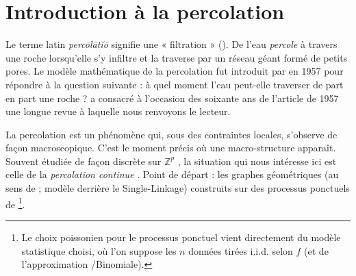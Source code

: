 

\section{Introduction à la percolation}

Le terme latin \emph{percōlātĭō} signifie une « filtration » (). De l'eau \emph{percole} à travers une roche lorsqu'elle s'y infiltre et la traverse par un réseau géant formé de petits pores. Le modèle mathématique de la percolation fut introduit par  \cite{BroadbentHammersley1957} en 1957 pour répondre à la question suivante : à quel moment l'eau peut-elle traverser de part en part une roche ?  \cite{SoixanteAnsPercolation} a consacré à l'occasion des soixante ans de l'article de 1957 une longue revue à laquelle nous renvoyons le lecteur.

La percolation est un phénomène qui, sous des contraintes locales, s'observe de façon macroscopique. C'est le moment précis où une macro-structure apparaît. Souvent étudiée de façon discrète sur $\mathbb Z^p$ \cite{Grimmett1999, Percolation2006}, la situation qui nous intéresse ici est celle de la \emph{percolation continue} \cite{MeesterRoy, penrose2003}. Point de départ : les graphes géométriques (au sens de  \cite{Penrose1995, penrose2003} ; modèle derrière le Single-Linkage) construits sur des processus ponctuels de \footnote{Le choix poissonien pour le processus ponctuel vient directement du modèle statistique choisi, où l'on suppose les $n$ données tirées i.i.d. selon $f$ (et de l'approximation /Binomiale).}.

